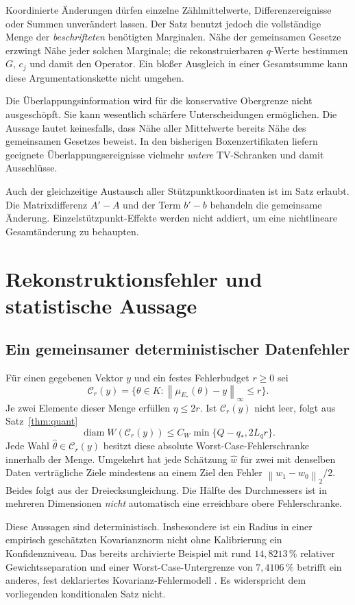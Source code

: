 \documentclass[11pt,a4paper]{article}
\theoremstyle{definition}\newtheorem{definition}{Definition}
\theoremstyle{remark}\newtheorem*{remark}{Bemerkung}
\newcommand{\norm}[1]{\left\lVert#1\right\rVert}
\newcommand{\diam}{\operatorname{diam}}
\begin{document}
Koordinierte Änderungen dürfen einzelne Zählmittelwerte, Differenzereignisse oder Summen unverändert lassen. Der Satz benutzt jedoch die vollständige Menge der \emph{beschrifteten} benötigten Marginalen. Nähe der gemeinsamen Gesetze erzwingt Nähe jeder solchen Marginale; die rekonstruierbaren $q$-Werte bestimmen $G$, $c_j$ und damit den Operator. Ein bloßer Ausgleich in einer Gesamtsumme kann diese Argumentationskette nicht umgehen.

Die Überlappungsinformation wird für die konservative Obergrenze nicht ausgeschöpft. Sie kann wesentlich schärfere Unterscheidungen ermöglichen. Die Aussage lautet keinesfalls, dass Nähe aller Mittelwerte bereits Nähe des gemeinsamen Gesetzes beweist. In den bisherigen Boxenzertifikaten liefern geeignete Überlappungsereignisse vielmehr \emph{untere} TV-Schranken und damit Ausschlüsse.

Auch der gleichzeitige Austausch aller Stützpunktkoordinaten ist im Satz erlaubt. Die Matrixdifferenz $A'-A$ und der Term $b'-b$ behandeln die gemeinsame Änderung. Einzelstützpunkt-Effekte werden nicht addiert, um eine nichtlineare Gesamtänderung zu behaupten.

\section{Rekonstruktionsfehler und statistische Aussage}

\subsection{Ein gemeinsamer deterministischer Datenfehler}
Für einen gegebenen Vektor $y$ und ein festes Fehlerbudget $r\geq0$ sei
\[
 \mathcal C_r(y)=\{\theta\in K:
       \norm{\mu_{E_*}(\theta)-y}_\infty\leq r\}.
\]
Je zwei Elemente dieser Menge erfüllen $\eta\leq2r$. Ist $\mathcal C_r(y)$ nicht leer, folgt aus Satz~\ref{thm:quant}
\begin{equation}
 \diam W(\mathcal C_r(y))
 \leq C_W\min\{Q-q_*,2L_qr\}.
\end{equation}
Jede Wahl $\widehat\theta\in\mathcal C_r(y)$ besitzt diese absolute Worst-Case-Fehlerschranke innerhalb der Menge. Umgekehrt hat jede Schätzung $\widehat w$ für zwei mit denselben Daten verträgliche Ziele mindestens an einem Ziel den Fehler $\norm{w_1-w_0}_2/2$. Beides folgt aus der Dreiecksungleichung. Die Hälfte des Durchmessers ist in mehreren Dimensionen \emph{nicht} automatisch eine erreichbare obere Fehlerschranke.

Diese Aussagen sind deterministisch. Insbesondere ist ein Radius in einer empirisch geschätzten Kovarianznorm nicht ohne Kalibrierung ein Konfidenzniveau. Das bereits archivierte Beispiel mit rund $14{,}8213\,\%$ relativer Gewichtsseparation und einer Worst-Case-Untergrenze von $7{,}4106\,\%$ betrifft ein anderes, fest deklariertes Kovarianz-Fehlermodell \cite{repo_old}. Es widerspricht dem vorliegenden konditionalen Satz nicht.
\end{document}
